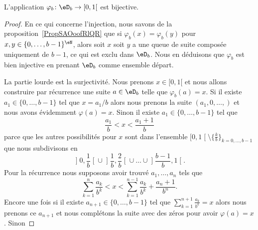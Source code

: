 \begin{theorem} \label{ThoRXBootpUpd}
    L'application \( \varphi_b\colon \eD_b\to \mathopen[ 0 , 1 [\) est bijective.
\end{theorem}

\begin{proof}
    En ce qui concerne l'injection, nous savons de la proposition~\ref{PropSAOoofRlQR} que si \( \varphi_b(x)=\varphi_b(y)\) pour \( x,y\in\{ 0,\ldots, b-1 \}^{\eN}\), alors soit \( x\) soit \( y\) a une queue de suite composée uniquement de \( b-1\), ce qui est exclu dans \( \eD_b\). Nous en déduisons que \( \varphi_b\) est bien injective en prenant \( \eD_b\) comme ensemble départ.

    La partie lourde est la surjectivité. Nous prenons \( x\in \mathopen[ 0 , 1 [\) et nous allons construire par récurrence une suite \( a\in \eD_b\) telle que \( \varphi_b(a)=x\). Si il existe \( a_1\in\{ 0,\ldots, b-1 \}\) tel que \( x=a_1/b\) alors nous prenons la suite \( (a_1,0,\ldots, )\) et nous avons évidemment \( \varphi(a)=x\). Sinon il existe \( a_1\in\{ 0,\ldots, b-1 \}\) tel que
        \begin{equation}
            \frac{ a_1 }{ b }<x<\frac{ a_1+1 }{ b }
        \end{equation}
        parce que les autres possibilités pour \( x\) sont dans l'ensemble \( \mathopen[ 0 , 1 \mathclose[\setminus\{ \frac{ k }{ b } \}_{k=0,\ldots, b-1}\) que nous subdivisons en
        \begin{equation}
        \mathopen] 0 , \frac{1}{ b } \mathclose[\cup\mathopen] \frac{1}{ b } , \frac{ 2 }{ b } \mathclose[\cup\ldots\cup\mathopen] \frac{ b-1 }{ b } , 1 \mathclose[.
        \end{equation}
        Pour la récurrence nous supposons avoir trouvé \( a_1,\ldots, a_n\) tels que
        \begin{equation}
            \sum_{k=1}^n\frac{ a_k }{ b^k }< x<\sum_{k=1}^{n-1}\frac{ a_k }{ b^k }+\frac{ a_n+1 }{ b^n }.
        \end{equation}
    Encore une fois si il existe \( a_{n+1}\in\{ 0,\ldots, b-1 \}\) tel que \( \sum_{k=1}^{n+1}\frac{ a_k }{ b^k }=x\) alors nous prenons ce \( a_{n+1}\) et nous complétons la suite avec des zéros pour avoir \( \varphi(a)=x\). Sinon

\end{proof}
